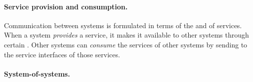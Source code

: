 \paragraph{Service provision and consumption.}
Communication between systems is formulated in terms of the  and  of services.
When a system \textit{provides} a service, it makes it available to other systems through certain .
Other systems can \textit{consume} the services of other systems by sending  to the service interfaces of those services.


\paragraph{System-of-systems.}

